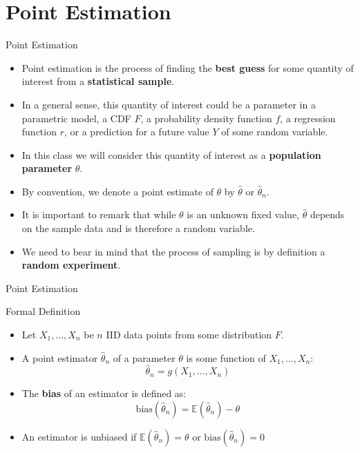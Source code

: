 \documentclass[handout]{beamer}
\begin{document}
\section{Point Estimation}

\begin{frame}{Point Estimation}
\scriptsize{
\begin{itemize}
 \item Point estimation is the process of finding the \textbf{best guess} for some quantity of interest from a \textbf{statistical sample}.
 \item In a general sense, this quantity of interest could be a parameter in a parametric model, a CDF $F$, a probability density function $f$, a regression function $r$, or a prediction for a future value $Y$ of some random variable.
 \item In this class we will consider this quantity of interest as a \textbf{population parameter} $\theta$. 
  \item By convention, we denote a point estimate of $\theta$ by $\hat{\theta}$ or $\hat{\theta}_n$.
 \item It is important to remark that while $\theta$ is an unknown fixed value, $\hat{\theta}$  depends on the sample data and is therefore a random variable. 
 \item We need to bear in mind that the process of sampling is by definition a \textbf{random experiment}. 
 
\end{itemize}

} 
\end{frame}

\begin{frame}{Point Estimation}


\scriptsize{
\begin{block}{Formal Definition}
\begin{itemize}
 \item Let $X_1, \dots, X_n$ be $n$ IID data points  from some distribution  $F$.
 \item A point estimator $\hat{\theta}_n$  of a parameter $\theta$ is some function of $X_1, \dots, X_n$:
 \begin{displaymath}
 \hat{\theta}_n=g(X_1, \dots, X_n) 
 \end{displaymath}
 
\end{itemize}

 
\end{block}

\begin{itemize}
 \item The \textbf{bias} of an estimator is defined as: 
\begin{displaymath}
 \text{bias}(\hat{\theta}_n)=\mathbb{E}(\hat{\theta}_n)-\theta
\end{displaymath}
\item An estimator is unbiased if $\mathbb{E}(\hat{\theta}_n)=\theta$ or  $\text{bias}(\hat{\theta}_n)=0 $
\end{itemize}

} 
\end{frame}
\end{document}
